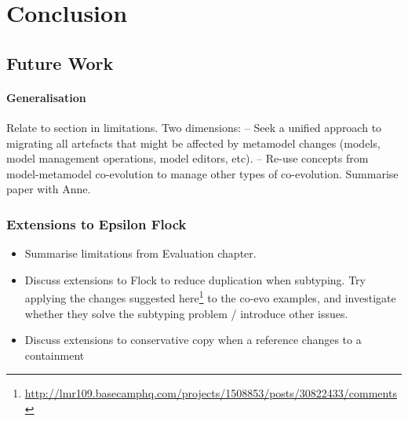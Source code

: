 
\chapter{Conclusion}



\section{Future Work}
\label{sec:future_work}

\subsubsection{Generalisation}
Relate to section in limitations. Two dimensions:
-- Seek a unified approach to migrating all artefacts that might be affected by metamodel changes (models, model management operations, model editors, etc).
-- Re-use concepts from model-metamodel co-evolution to manage other types of co-evolution. Summarise paper with Anne.

\subsection{Extensions to Epsilon Flock}
\begin{itemize}
	\item Summarise limitations from Evaluation chapter.
	\item Discuss extensions to Flock to reduce duplication when subtyping.
	\subitem Try applying the changes suggested here\footnote{\url{http://lmr109.basecamphq.com/projects/1508853/posts/30822433/comments}} to the co-evo examples, and investigate whether they solve the subtyping problem / introduce other issues. 
	\item Discuss extensions to conservative copy when a reference changes to a containment
\end{itemize}